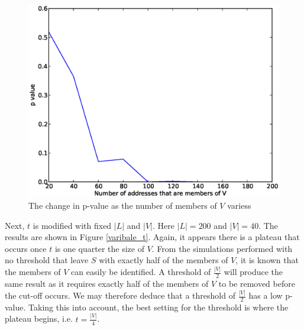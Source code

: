 \documentclass[ %
                    author={Luke Murray},
                supervisor={Dr. Simon Hollis},
                     title={Shadow Peer-to-Peer Networks},
                  subtitle={},
                    degree={MEng},
                      year={2013} ]{thesis}
\begin{document}
\begin{figure}[h]
    \centering
    \begin{minipage}[b]{0.8\linewidth}
        \centering
        \includegraphics[width=\linewidth]{diagrams/variable_v.eps}
        \caption{The change in p-value as the number of members of $V$ variess}
    \end{minipage}
    \label{variable_v}
\end{figure}

Next, $t$ is modified with fixed $|L|$ and $|V|$. Here $|L| = 200$ and $|V| = 40$. The results are shown in Figure \ref{varibale_t}. Again, it appears there is a plateau that occurs once $t$ is one quarter the size of $V$. From the simulations performed with no threshold that leave $S$ with exactly half of the members of $V$, it is known that the members of $V$ can easily be identified. A threshold of $\frac{|V|}{2}$ will produce the same result as it requires exactly half of the members of $V$ to be removed before the cut-off occurs. We may therefore deduce that a threshold of $\frac{|V|}{2}$ has a low p-value. Taking this into account, the best setting for the threshold is where the plateau begins, i.e. $t = \frac{|V|}{4}$.
\end{document}
